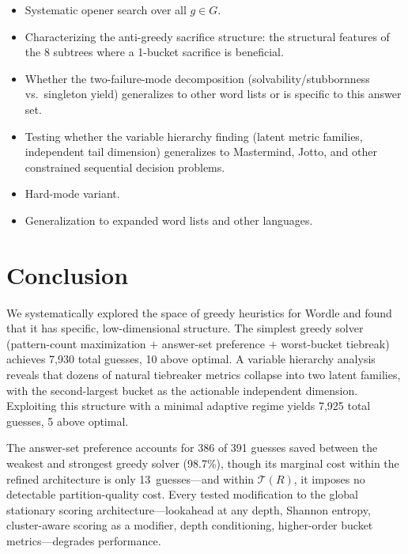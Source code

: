 \documentclass[11pt]{article}
\begin{document}
	\begin{itemize}[nosep]
		\item Systematic opener search over all $g \in G$.
		\item Characterizing the anti-greedy sacrifice structure: the structural features of the 8 subtrees where a 1-bucket sacrifice is beneficial.
		\item Whether the two-failure-mode decomposition (solvability/stubbornness vs.\ singleton yield) generalizes to other word lists or is specific to this answer set.
		\item Testing whether the variable hierarchy finding (latent metric families, independent tail dimension) generalizes to Mastermind, Jotto, and other constrained sequential decision problems.
		\item Hard-mode variant.
		\item Generalization to expanded word lists and other languages.
	\end{itemize}
	
	\section{Conclusion}
	
	We systematically explored the space of greedy heuristics for Wordle and found that it has specific, low-dimensional structure.  The simplest greedy solver (pattern-count maximization $+$ answer-set preference $+$ worst-bucket tiebreak) achieves 7,930 total guesses, 10 above optimal.  A variable hierarchy analysis reveals that dozens of natural tiebreaker metrics collapse into two latent families, with the second-largest bucket as the actionable independent dimension.  Exploiting this structure with a minimal adaptive regime yields 7,925 total guesses, 5 above optimal.
	
	The answer-set preference accounts for 386 of 391 guesses saved between the weakest and strongest greedy solver (98.7\%), though its marginal cost within the refined architecture is only 13~guesses---and within $\mathcal{T}(R)$, it imposes no detectable partition-quality cost.  Every tested modification to the global stationary scoring architecture---lookahead at any depth, Shannon entropy, cluster-aware scoring as a modifier, depth conditioning, higher-order bucket metrics---degrades performance.
	
\end{document}
